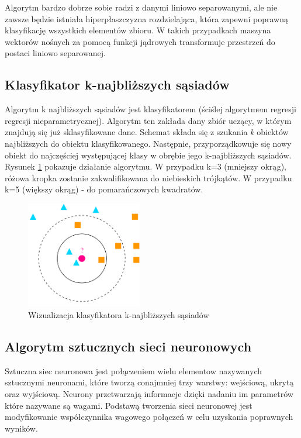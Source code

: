 \documentclass[a4paper,11pt]{article}
\begin{document}
Algorytm bardzo dobrze sobie radzi z danymi liniowo separowanymi, ale nie zawsze będzie istniała hiperpłaszczyzna rozdzielająca, która zapewni poprawną klasyfikację wszystkich elementów zbioru. W takich przypadkach maszyna wektorów nośnych za pomocą funkcji jądrowych transformuje przestrzeń do postaci liniowo separowanej.

\subsection{Klasyfikator k-najbliższych sąsiadów}
Algorytm k najbliższych sąsiadów jest klasyfikatorem (ściślej algorytmem regresji regresji nieparametrycznej). Algorytm ten zakłada dany zbiór uczący, w którym znajdują się już sklasyfikowane dane. Schemat składa się z szukania \textit{k} obiektów najbliższych do obiektu klasyfikowanego. Następnie, przyporządkowuje się nowy obiekt do najczęściej występującej klasy w obrębie jego k-najbliższych sąsiadów.\\

Rysunek \ref{fig:knn} pokazuje działanie algorytmu. W przypadku k=3 (mniejszy okrąg), różowa kropka zostanie zakwalifikowana do niebieskich trójkątów. W przypadku k=5 (większy okrąg) - do pomarańczowych kwadratów.

\begin{figure}[!htbp]
    	\centering
    	\includegraphics[width=0.45\textwidth]{images/knn.png}
    	\caption{ Wizualizacja klasyﬁkatora k-najbliższych sąsiadów}
    	\label{fig:knn}
\end{figure}

\subsection{Algorytm sztucznych sieci neuronowych}
Sztuczna siec neuronowa  jest połączeniem wielu elementow nazywanych sztucznymi neuronami, które tworzą conajmniej trzy warstwy: wejściową, ukrytą oraz wyjściową. Neurony przetwarzają informacje dzięki nadaniu im parametrów które nazywane są wagami. Podstawą tworzenia sieci neuronowej jest modyfikowanie współczynnika wagowego połączeń w celu uzyskania poprawnych wyników.
\end{document}
